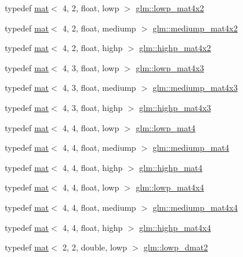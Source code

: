 \begin{DoxyCompactItemize}
\item 
typedef \hyperlink{structglm_1_1mat}{mat}$<$ 4, 2, float, lowp $>$ \hyperlink{group__core__precision_gacd6c35b61e9de6ad39767ea58660a602}{glm\+::lowp\+\_\+mat4x2}
\item 
typedef \hyperlink{structglm_1_1mat}{mat}$<$ 4, 2, float, mediump $>$ \hyperlink{group__core__precision_gaf0c9bd4c952160fa6f63ae8ab243beea}{glm\+::mediump\+\_\+mat4x2}
\item 
typedef \hyperlink{structglm_1_1mat}{mat}$<$ 4, 2, float, highp $>$ \hyperlink{group__core__precision_ga0355949c79024224f7e9cfa06bc82153}{glm\+::highp\+\_\+mat4x2}
\item 
typedef \hyperlink{structglm_1_1mat}{mat}$<$ 4, 3, float, lowp $>$ \hyperlink{group__core__precision_ga23926fa6809eae2c18451a1a7b4dd6a8}{glm\+::lowp\+\_\+mat4x3}
\item 
typedef \hyperlink{structglm_1_1mat}{mat}$<$ 4, 3, float, mediump $>$ \hyperlink{group__core__precision_ga2d5eb7a43e7564b4e048512b8488994a}{glm\+::mediump\+\_\+mat4x3}
\item 
typedef \hyperlink{structglm_1_1mat}{mat}$<$ 4, 3, float, highp $>$ \hyperlink{group__core__precision_ga20620a62fd7d4e020e772c4d258cf2e4}{glm\+::highp\+\_\+mat4x3}
\item 
typedef \hyperlink{structglm_1_1mat}{mat}$<$ 4, 4, float, lowp $>$ \hyperlink{group__core__precision_ga692c14e84ad690b182373bec9fdf1ab9}{glm\+::lowp\+\_\+mat4}
\item 
typedef \hyperlink{structglm_1_1mat}{mat}$<$ 4, 4, float, mediump $>$ \hyperlink{group__core__precision_ga0987ea03f27d035ebd79fd71ca394be1}{glm\+::mediump\+\_\+mat4}
\item 
typedef \hyperlink{structglm_1_1mat}{mat}$<$ 4, 4, float, highp $>$ \hyperlink{group__core__precision_gab46132805773d55f00fce859bc71e799}{glm\+::highp\+\_\+mat4}
\item 
typedef \hyperlink{structglm_1_1mat}{mat}$<$ 4, 4, float, lowp $>$ \hyperlink{group__core__precision_gaf8957db9f94a9c01a63db849da81bea0}{glm\+::lowp\+\_\+mat4x4}
\item 
typedef \hyperlink{structglm_1_1mat}{mat}$<$ 4, 4, float, mediump $>$ \hyperlink{group__core__precision_ga80dd7aaae2879e86a588c36a39652ee4}{glm\+::mediump\+\_\+mat4x4}
\item 
typedef \hyperlink{structglm_1_1mat}{mat}$<$ 4, 4, float, highp $>$ \hyperlink{group__core__precision_ga93c7db376e7b0bd24ef4947667468c9a}{glm\+::highp\+\_\+mat4x4}
\item 
typedef \hyperlink{structglm_1_1mat}{mat}$<$ 2, 2, double, lowp $>$ \hyperlink{group__core__precision_gaf2d0890fdba0e76d2bd2a169c1a71b00}{glm\+::lowp\+\_\+dmat2}

\end{DoxyCompactItemize}
